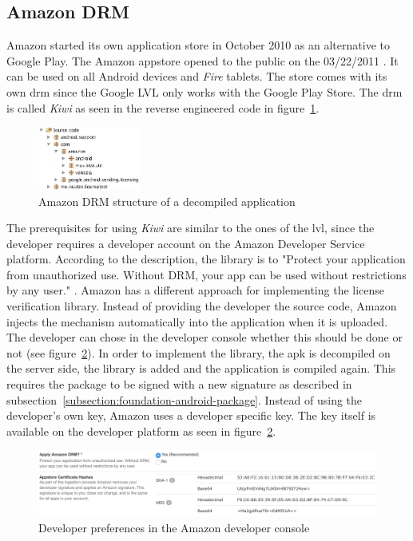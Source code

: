 \subsection{Amazon DRM} \label{section:license-amazon}
Amazon started its own application store in October 2010 \cite{amazonBeta} as an alternative to Google Play.
The Amazon appstore opened to the public on the 03/22/2011 \cite{amazonRelease}.
It can be used on all Android devices and \textit{Fire} tablets.
The store comes with its own \gls{drm} since the Google LVL only works with the Google Play Store.
The \gls{drm} is called \textit{Kiwi} as seen in the reverse engineered code in figure~\ref{fig:amazonFolder}.
\newline
\begin{figure}[h]
    \centering
    \includegraphics[width=0.3\textwidth]{data/amazonFolder.png}
    \caption{Amazon DRM structure of a decompiled application}
    \label{fig:amazonFolder}
\end{figure}
The prerequisites for using \textit{Kiwi} are similar to the ones of the \gls{lvl}, since the developer requires a developer account on the Amazon Developer Service platform.
According to the description, the library is to "Protect your application from unauthorized use. Without DRM, your app can be used without restrictions by any user." \cite{amazonDeveloper}.
\newline
Amazon has a different approach for implementing the license verification library.
Instead of providing the developer the source code, Amazon injects the mechanism automatically into the application when it is uploaded.
The developer can chose in the developer console whether this should be done or not (see figure~\ref{fig:amazon}).
In order to implement the library, the \gls{apk} is decompiled on the server side, the library is added and the application is compiled again.
This requires the package to be signed with a new signature as described in subsection~\ref{subsection:foundation-android-package}.
Instead of using the developer's own key, Amazon uses a developer specific key.
The key itself is available on the developer platform as seen in figure~\ref{fig:amazon}. \cite{amazonDeveloper}
\newline
\begin{figure}[h]
    \centering
    \includegraphics[width=1\textwidth]{data/amazon.png}
    \caption{Developer preferences in the Amazon developer console \cite{amazonDeveloper}}
    \label{fig:amazon}
\end{figure}
